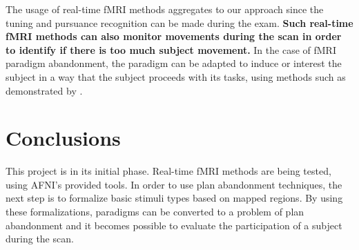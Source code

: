 \documentclass[twocolumn]{bmcart}%
\begin{document}
The usage of real-time fMRI methods aggregates to our approach since the
tuning and pursuance recognition can be made during the exam. \textbf{Such real-time fMRI methods can also monitor movements during the scan in order to identify if there is too much subject movement.} In the case of fMRI paradigm abandonment, the paradigm can be adapted to induce or interest the subject in a way that the subject proceeds with its
tasks, using methods such as demonstrated by \cite{Dongha2011}.

\section{Conclusions}\label{conclusions}

This project is in its initial phase. Real-time fMRI methods are being
tested, using AFNI's provided tools. In order to use plan abandonment
techniques, the next step is to formalize basic stimuli types based on
mapped regions. By using these formalizations, paradigms can be
converted to a problem of plan abandonment and it becomes possible to
evaluate the participation of a subject during the scan.

\end{document}
